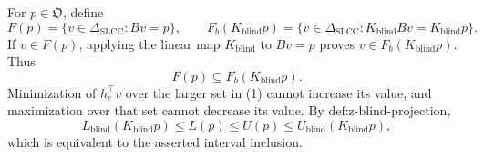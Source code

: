 For \(p\in\mathfrak O\), define
\[
F(p)=\{v\in\Delta_{\mathrm{SLCC}}:Bv=p\},
\qquad
F_b(K_{\mathrm{blind}}p)
=\{v\in\Delta_{\mathrm{SLCC}}:K_{\mathrm{blind}}Bv=K_{\mathrm{blind}}p\}.
\]
If \(v\in F(p)\), applying the linear map \(K_{\mathrm{blind}}\) to \(Bv=p\) proves \(v\in F_b(K_{\mathrm{blind}}p)\).  Thus
\[
F(p)\subseteq F_b(K_{\mathrm{blind}}p).
\tag{1}
\]
Minimization of \(h_e^{\top}v\) over the larger set in (1) cannot increase its value, and maximization over that set cannot decrease its value.  By \(\text{def:z-blind-projection}\),
\[
L_{\mathrm{blind}}(K_{\mathrm{blind}}p)\leq L(p)
\leq U(p)\leq U_{\mathrm{blind}}(K_{\mathrm{blind}}p),
\]
which is equivalent to the asserted interval inclusion.
